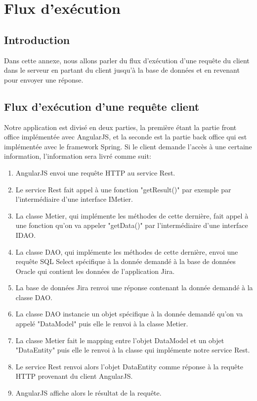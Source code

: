 \chapter{Flux d'exécution}
\section{Introduction}
Dans cette annexe, nous allons parler du flux d'exécution d'une requête du client dans le serveur en partant du client jusqu'à la base de données et en revenant pour envoyer une réponse.
\section{Flux d'exécution d'une requête client}
Notre application est divisé en deux parties, la première étant la partie front office implémentée avec AngularJS, et la seconde est la partie back office qui est implémentée avec le framework Spring. Si le client demande l'accès à une certaine information, l'information sera livré comme suit:\\

\begin{enumerate}
    \item AngularJS envoi une requête HTTP au service Rest.
    \item Le service Rest fait appel à une fonction "getResult()" par exemple par l'intermédiaire d'une interface IMetier.
    \item La classe Metier, qui implémente les méthodes de cette dernière, fait appel à une fonction qu'on va appeler "getData()" par l'intermédiaire d'une interface IDAO.
    \item La classe DAO, qui implémente les méthodes de cette dernière, envoi une requête SQL Select spécifique à la donnée demandé à la base de données Oracle qui contient les données de l'application Jira.
    \item La base de données Jira renvoi une réponse contenant la donnée demandé à la classe DAO.
    \item La classe DAO instancie un objet spécifique à la donnée demandé qu'on va appelé "DataModel" puis elle le renvoi à la classe Metier.
    \item La classe Metier fait le mapping entre l'objet DataModel et un objet "DataEntity" puis elle le renvoi à la classe qui implémente notre service Rest.
    \item Le service Rest renvoi alors l'objet DataEntity comme réponse à la requête HTTP provenant du client AngularJS.
    \item AngularJS affiche alors le résultat de la requête.\\
\end{enumerate}

